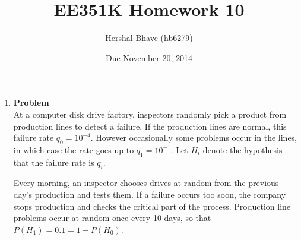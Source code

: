 \documentclass[12pt]{article}
\title{EE351K Homework 10}
\author{Hershal Bhave (hb6279)}
\date{Due November 20, 2014}
\newenvironment{Ex}{\textbf{Problem}\vspace{.75em}\\}{}
\begin{document}
\maketitle
\begin{enumerate}
\item
  \begin{Ex}
    At a computer disk drive factory, inspectors randomly pick a
    product from production lines to detect a failure. If the
    production lines are normal, this failure rate $q_0 =
    10^{-4}$. However occasionally some problems occur in the lines,
    in which case the rate goes up to $q_1 = 10^{-1}$. Let $H_i$
    denote the hypothesis that the failure rate is $q_i$.

    Every morning, an inspector chooses drives at random from the
    previous day’s production and tests them. If a failure occurs too
    soon, the company stops production and checks the critical part of
    the process. Production line problems occur at random once every
    10 days, so that $P(H_1) = 0.1 = 1 - P(H_0)$.


\end{Ex}
\end{enumerate}
\end{document}
